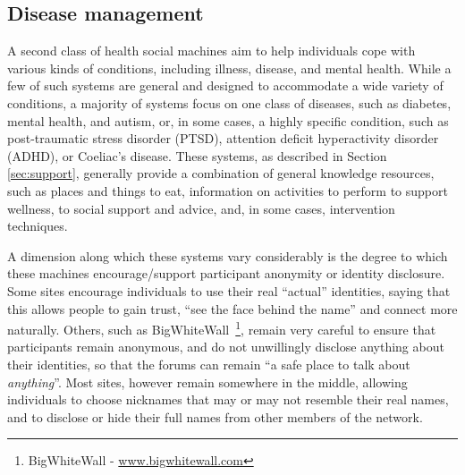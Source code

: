 \documentclass{www13-companion-accepted}
\begin{document}
\subsection{Disease management}

A second class of health social machines aim to help individuals cope
with various kinds of conditions, including illness, disease, and
mental health.  While a few of such systems are general and designed
to accommodate a wide variety of conditions, a majority of systems
focus on one class of diseases, such as diabetes, mental health, and
autism, or, in some cases, a highly specific condition, such as
post-traumatic stress disorder (PTSD), attention deficit hyperactivity
disorder (ADHD), or Coeliac's disease.  These systems, as described in
Section \ref{sec:support}, generally provide a combination of
general knowledge resources, such as places and things to eat,
information on activities to perform to support wellness, to social
support and advice, and, in some cases, intervention techniques.

A dimension along which these systems vary considerably is the degree
to which these machines encourage/support participant anonymity or
identity disclosure.  Some sites encourage individuals to use their
real ``actual'' identities, saying that this allows people to gain
trust, ``see the face behind the name'' and connect more naturally.
Others, such as BigWhiteWall~\footnote{BigWhiteWall - \url{www.bigwhitewall.com}}, remain very careful to ensure that
participants remain anonymous, and do not unwillingly disclose
anything about their identities, so that the forums can remain ``a
safe place to talk about \emph{anything}''.  Most sites, however
remain somewhere in the middle, allowing individuals to choose
nicknames that may or may not resemble their real names, and to
disclose or hide their full names from other members of the network.
\end{document}

